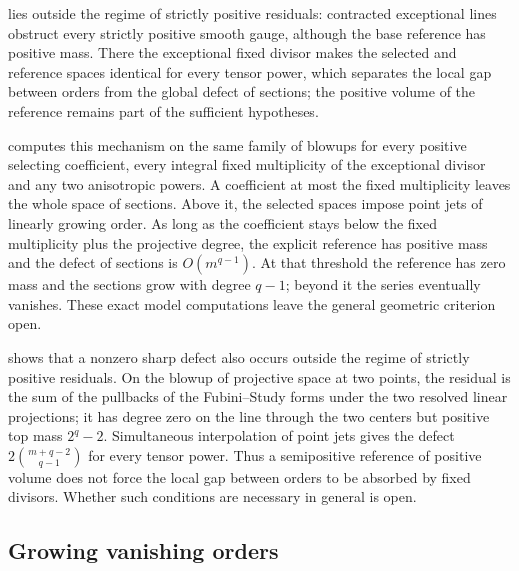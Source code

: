  lies outside the regime of strictly positive residuals: contracted exceptional lines obstruct every strictly positive smooth gauge, although the base reference has positive mass. There the exceptional fixed divisor makes the selected and reference spaces identical for every tensor power, which separates the local gap between orders from the global defect of sections; the positive volume of the reference remains part of the sufficient hypotheses.

 computes this mechanism on the same family of blowups for every positive selecting coefficient, every integral fixed multiplicity of the exceptional divisor and any two anisotropic powers. A coefficient at most the fixed multiplicity leaves the whole space of sections. Above it, the selected spaces impose point jets of linearly growing order. As long as the coefficient stays below the fixed multiplicity plus the projective degree, the explicit reference has positive mass and the defect of sections is $O(m^{q-1})$. At that threshold the reference has zero mass and the sections grow with degree $q-1$; beyond it the series eventually vanishes. These exact model computations leave the general geometric criterion open.

 shows that a nonzero sharp defect also occurs outside the regime of strictly positive residuals. On the blowup of projective space at two points, the residual is the sum of the pullbacks of the Fubini--Study forms under the two resolved linear projections; it has degree zero on the line through the two centers but positive top mass $2^q-2$. Simultaneous interpolation of point jets gives the defect $2\binom{m+q-2}{q-1}$ for every tensor power. Thus a semipositive reference of positive volume does not force the local gap between orders to be absorbed by fixed divisors. Whether such conditions are necessary in general is open.

\subsection{Growing vanishing orders}
\label{prob:growing-jets-localization}

